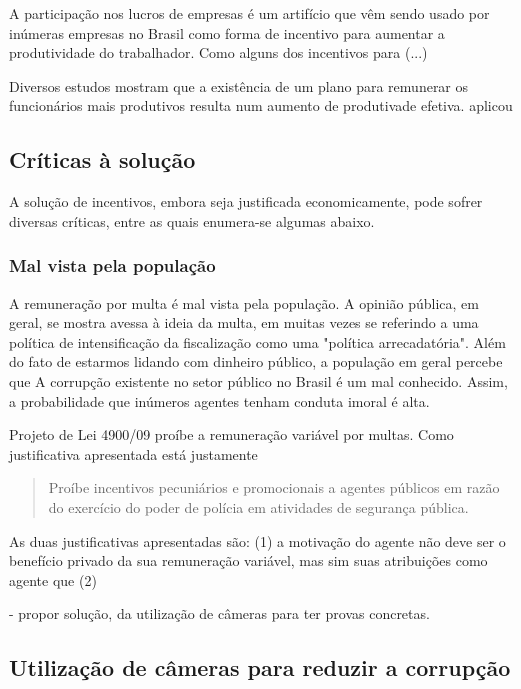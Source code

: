 \documentclass[
	article,			%
	12pt,				%
	oneside,			%
	a4paper,			%
	english,			%
	brazil,				%
	]{abntex2}
\begin{document}
A participação nos lucros de empresas é um artifício que vêm sendo usado por inúmeras empresas no Brasil como forma de incentivo para aumentar a produtividade do trabalhador.  Como alguns dos incentivos para (...)

Diversos estudos mostram que a existência de um plano para remunerar os funcionários mais produtivos resulta num aumento de produtivade efetiva.  aplicou 




\subsection{Críticas à solução}

A solução de incentivos, embora seja justificada economicamente, pode sofrer diversas críticas, entre as quais enumera-se algumas abaixo.

\subsubsection*{Mal vista pela população} 

A remuneração por multa é mal vista pela população. A opinião pública, em geral, se mostra avessa à ideia da multa, em muitas vezes se referindo a uma política de intensificação da fiscalização como uma "política arrecadatória".
Além do fato de estarmos lidando com dinheiro público, a população em geral percebe que   A corrupção existente no setor público no Brasil é um mal conhecido. Assim, a probabilidade que inúmeros agentes tenham conduta imoral é alta.

Projeto de Lei 4900/09 proíbe a remuneração variável por multas. Como justificativa apresentada está justamente 

\begin{quote}
Proíbe incentivos pecuniários e promocionais a agentes públicos em razão do exercício do poder de polícia em atividades de segurança pública.
\end{quote}

As duas justificativas apresentadas são:
(1) a motivação do agente não deve ser o benefício privado da sua remuneração variável, mas sim suas atribuições como agente que 
(2) 


- propor solução, da utilização de câmeras para ter provas concretas.

\subsection{Utilização de câmeras para reduzir a corrupção}
\end{document}
